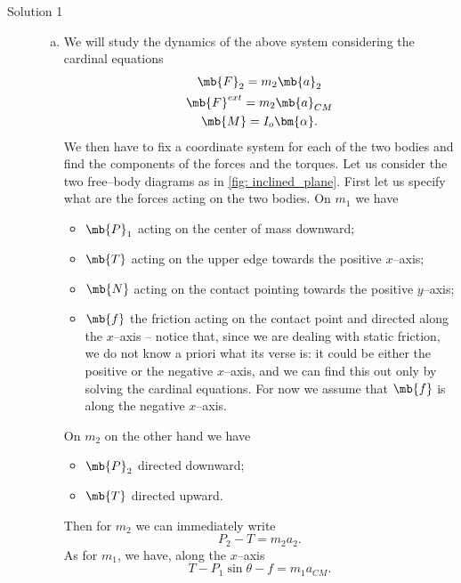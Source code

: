 \begin{description}
    \item[Solution 1] 
    \begin{enumerate}[(a)]
        \item We will study the dynamics of the above system considering the cardinal equations 
        \begin{gather}
            \mb{F}_2 = m_2 \mb{a}_2 \\
            \mb{F}^{ext} = m_2 \mb{a}_{CM} \\
            \mb{M} = I_o \bm{\alpha}.
        \end{gather}  
        We then have to fix a coordinate system for each of the two bodies and find the components of the forces and the torques. Let us consider the two free--body diagrams as in \cref{fig: inclined_plane}. First let us specify what are the forces acting on the two bodies. On $m_1$ we have
        \begin{itemize}
            \item $\mb{P}_1$ acting on the center of mass downward;
            \item $\mb{T}$ acting on the upper edge towards the positive $x$--axis;
            \item $\mb{N}$ acting on the contact pointing towards the positive $y$--axis;
            \item $\mb{f}$ the friction acting on the contact point and directed along the $x$--axis -- notice that, since we are dealing with static friction, we do not know a priori what its verse is: it could be either the positive or the negative $x$--axis, and we can find this out only by solving the cardinal equations. For now we assume that $\mb{f}$ is along the negative $x$--axis.
        \end{itemize}
        On $m_2$ on the other hand we have 
        \begin{itemize}
            \item $\mb{P}_2$ directed downward;
            \item $\mb{T}$ directed upward.
        \end{itemize}
        Then for $m_2$ we can immediately write
        \begin{equation}
            P_2 - T = m_2 a_2.
        \end{equation}
        As for $m_1$, we have, along the $x$--axis
        \begin{equation}
            T - P_1 \sin \theta - f = m_1 a_{CM}.
        \end{equation}

\end{enumerate}
\end{description}
